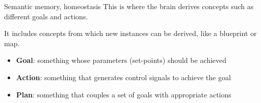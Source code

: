 \begin{frame}[allowframebreaks]{Semantic memory, homeostasis}
    This is where the brain derives concepts such as different goals and actions.
    
    It includes concepts from which new instances can be derived, like a blueprint or map.
    \begin{itemize}
        \item \textbf{Goal}: something whose parameters (set-points) should be achieved
        \item \textbf{Action}: something that generates control signals to achieve the goal
        \item \textbf{Plan}: something that couples a set of goals with appropriate actions
    \end{itemize}

\end{frame}